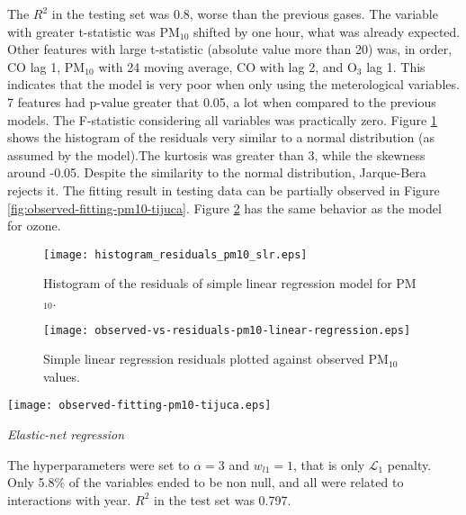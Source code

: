 The $R^2$ in the testing set was 0.8, worse than the previous gases. The
variable with greater t-statistic was PM$_{10}$ shifted by one hour, what was already expected. Other features with
large t-statistic (absolute value more than
20) was, in
order, CO lag 1, PM$_{10}$ with 24 moving average, CO with lag
2, and O$_{3}$ lag 1. This indicates that the model is very poor when only
using the meterological variables. 7 features had p-value
greater that 0.05, a lot when compared to the previous models. The F-statistic considering all variables was practically zero. Figure \ref{fig:histogram-residuals-pm10-slr} shows
the histogram of the residuals very similar to a normal distribution (as
assumed by the model).The kurtosis was greater than 3, while the skewness around
-0.05. Despite the similarity to the normal distribution, Jarque-Bera rejects
it. The fitting result in testing data can be
partially observed in Figure \ref{fig:observed-fitting-pm10-tijuca}.  Figure
\ref{fig:observed-vs-residual-pm10-linear-regression} has the same behavior as
the model for ozone.  

\begin{figure}
    \centering
    \texttt{[image: histogram\_residuals\_pm10\_slr.eps]}
    \caption{Histogram of the residuals of simple linear regression model for PM$_{10}$.}
    \label{fig:histogram-residuals-pm10-slr}
\end{figure}

\begin{figure}[!ht]
    \centering
    \texttt{[image: observed-vs-residuals-pm10-linear-regression.eps]}
    \caption{Simple linear regression residuals plotted against
    observed PM$_{10}$ values.}
    \label{fig:observed-vs-residual-pm10-linear-regression}
\end{figure}

\begin{figure*}[!ht]
    \centering
    \texttt{[image: observed-fitting-pm10-tijuca.eps]}
    \caption{Observed and predicted PM$_{10}$ values for different months in Tijuca.}
    \label{fig:observed-fitting-pm10-tijuca}
\end{figure*}

\vspace{2mm}

{\em Elastic-net regression}

\vspace{2mm}

The hyperparameters were set to $\alpha = 3$
and $w_{l1} = 1$, that is only $\mathcal{L}_1$ penalty. Only 5.8\% of the
variables ended to be non null, and all were related to interactions with
year. $R^2$ in the test set was 0.797.

